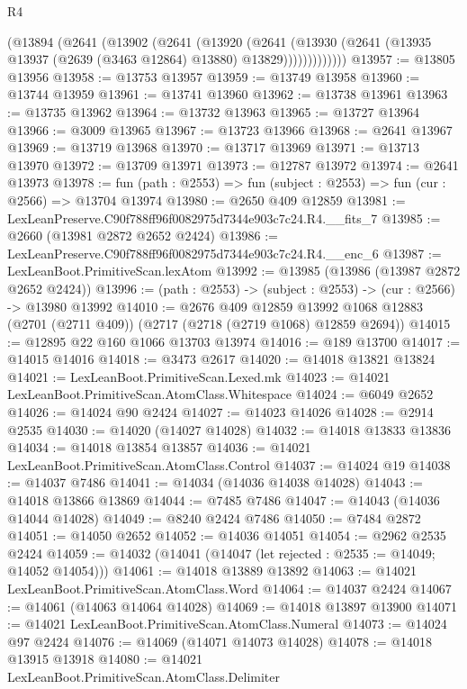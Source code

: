 \begin{lexlean}{R4}
\begin{coremodule}
            (@13894
              (@2641
                (@13902
                  (@2641
                    (@13920
                      (@2641
                        (@13930
                          (@2641 (@13935 @13937 (@2639 (@3463 @12864) @13880) @13829)))))))))))))
@13957 := @13805 @13956
@13958 := @13753 @13957
@13959 := @13749 @13958
@13960 := @13744 @13959
@13961 := @13741 @13960
@13962 := @13738 @13961
@13963 := @13735 @13962
@13964 := @13732 @13963
@13965 := @13727 @13964
@13966 := @3009 @13965
@13967 := @13723 @13966
@13968 := @2641 @13967
@13969 := @13719 @13968
@13970 := @13717 @13969
@13971 := @13713 @13970
@13972 := @13709 @13971
@13973 := @12787 @13972
@13974 := @2641 @13973
@13978 := fun (path : @2553) => fun (subject : @2553) => fun (cur : @2566) => @13704 @13974
@13980 := @2650 @409 @12859
@13981 := LexLeanPreserve.C90f788ff96f0082975d7344e903c7c24.R4.__fits_7
@13985 := @2660 (@13981 @2872 @2652 @2424)
@13986 := LexLeanPreserve.C90f788ff96f0082975d7344e903c7c24.R4.__enc_6
@13987 := LexLeanBoot.PrimitiveScan.lexAtom
@13992 := @13985 (@13986 (@13987 @2872 @2652 @2424))
@13996 := (path : @2553) -> (subject : @2553) -> (cur : @2566) -> @13980 @13992
@14010 := @2676
    @409
    @12859
    @13992
    @1068
    @12883
    (@2701 (@2711 @409))
    (@2717 (@2718 (@2719 @1068) @12859 @2694))
@14015 := @12895 @22 @160 @1066 @13703 @13974
@14016 := @189 @13700
@14017 := @14015 @14016
@14018 := @3473 @2617
@14020 := @14018 @13821 @13824
@14021 := LexLeanBoot.PrimitiveScan.Lexed.mk
@14023 := @14021 LexLeanBoot.PrimitiveScan.AtomClass.Whitespace
@14024 := @6049 @2652
@14026 := @14024 @90 @2424
@14027 := @14023 @14026
@14028 := @2914 @2535
@14030 := @14020 (@14027 @14028)
@14032 := @14018 @13833 @13836
@14034 := @14018 @13854 @13857
@14036 := @14021 LexLeanBoot.PrimitiveScan.AtomClass.Control
@14037 := @14024 @19
@14038 := @14037 @7486
@14041 := @14034 (@14036 @14038 @14028)
@14043 := @14018 @13866 @13869
@14044 := @7485 @7486
@14047 := @14043 (@14036 @14044 @14028)
@14049 := @8240 @2424 @7486
@14050 := @7484 @2872
@14051 := @14050 @2652
@14052 := @14036 @14051
@14054 := @2962 @2535 @2424
@14059 := @14032 (@14041 (@14047 (let rejected : @2535 := @14049; @14052 @14054)))
@14061 := @14018 @13889 @13892
@14063 := @14021 LexLeanBoot.PrimitiveScan.AtomClass.Word
@14064 := @14037 @2424
@14067 := @14061 (@14063 @14064 @14028)
@14069 := @14018 @13897 @13900
@14071 := @14021 LexLeanBoot.PrimitiveScan.AtomClass.Numeral
@14073 := @14024 @97 @2424
@14076 := @14069 (@14071 @14073 @14028)
@14078 := @14018 @13915 @13918
@14080 := @14021 LexLeanBoot.PrimitiveScan.AtomClass.Delimiter

\end{coremodule}
\end{lexlean}
